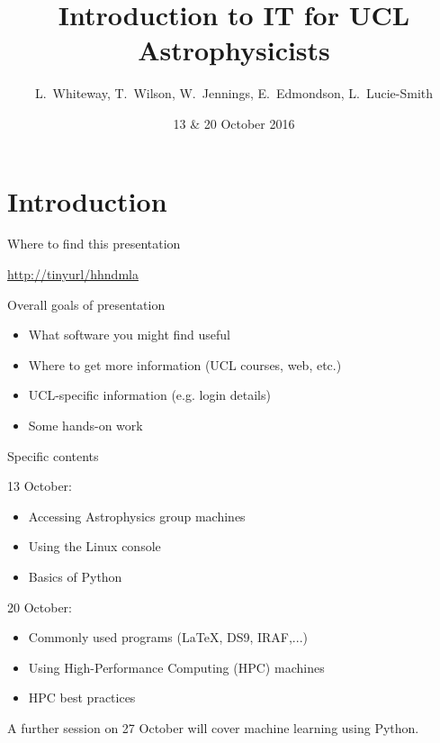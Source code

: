 \documentclass{beamer}
\title[IT Workshops] %
{Introduction to IT for UCL Astrophysicists}
\author{L.~Whiteway, T.~Wilson, W.~Jennings, E.~Edmondson, L.~Lucie-Smith}
\institute[UCL]
{
  Department of Physics and Astronomy\\
  University College London
}
\date[IT 2016]
{13 \& 20 October 2016}
\begin{document}
\frame{\titlepage}

\section{Introduction}

\begin{frame}{Where to find this presentation}
  \begin{block}{}
    \url{http://tinyurl/hhndmla}
  \end{block}
\end{frame}


\begin{frame}{Overall goals of presentation}
  \begin{itemize}
    \item What software you might find useful
    \item Where to get more information (UCL courses, web, etc.)
    \item UCL-specific information (e.g. login details)
    \item Some hands-on work
  \end{itemize}
\end{frame}

\begin{frame}{Specific contents}

  \begin{block}{13 October:}
    \begin{itemize}
      \item Accessing Astrophysics group machines
      \item Using the Linux console
      \item Basics of Python
    \end{itemize}
  \end{block}
  
  \begin{block}{20 October:}
    \begin{itemize}
    \item Commonly used programs (LaTeX, DS9, IRAF,...)
    \item Using High-Performance Computing (HPC) machines
    \item HPC best practices
    \end{itemize}
  \end{block}
  
  \begin{block}{A further session on 27 October will cover machine learning using Python.}
  \end{block}

\end{frame}
\end{document}
